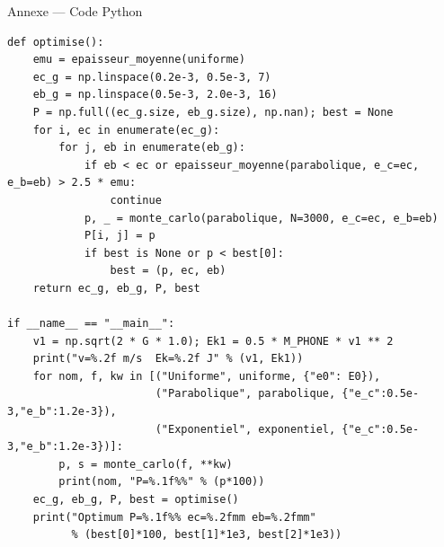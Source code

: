 \documentclass[11pt,aspectratio=169]{beamer}
\begin{document}
\begin{frame}{Annexe --- Code Python}
\begin{verbatim}
def optimise():
    emu = epaisseur_moyenne(uniforme)
    ec_g = np.linspace(0.2e-3, 0.5e-3, 7)
    eb_g = np.linspace(0.5e-3, 2.0e-3, 16)
    P = np.full((ec_g.size, eb_g.size), np.nan); best = None
    for i, ec in enumerate(ec_g):
        for j, eb in enumerate(eb_g):
            if eb < ec or epaisseur_moyenne(parabolique, e_c=ec, e_b=eb) > 2.5 * emu:
                continue
            p, _ = monte_carlo(parabolique, N=3000, e_c=ec, e_b=eb)
            P[i, j] = p
            if best is None or p < best[0]:
                best = (p, ec, eb)
    return ec_g, eb_g, P, best

if __name__ == "__main__":
    v1 = np.sqrt(2 * G * 1.0); Ek1 = 0.5 * M_PHONE * v1 ** 2
    print("v=%.2f m/s  Ek=%.2f J" % (v1, Ek1))
    for nom, f, kw in [("Uniforme", uniforme, {"e0": E0}),
                       ("Parabolique", parabolique, {"e_c":0.5e-3,"e_b":1.2e-3}),
                       ("Exponentiel", exponentiel, {"e_c":0.5e-3,"e_b":1.2e-3})]:
        p, s = monte_carlo(f, **kw)
        print(nom, "P=%.1f%%" % (p*100))
    ec_g, eb_g, P, best = optimise()
    print("Optimum P=%.1f%% ec=%.2fmm eb=%.2fmm"
          % (best[0]*100, best[1]*1e3, best[2]*1e3))
\end{verbatim}
\end{frame}
\end{document}
